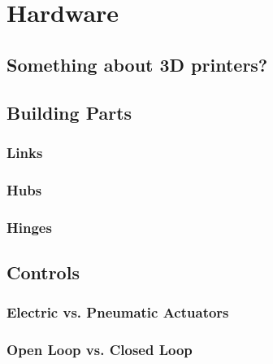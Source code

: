 \chapter{Hardware}\label{ch:hardware}
\section{Something about 3D printers?}
\section{Building Parts}
\subsection{Links}
\subsection{Hubs}
\subsection{Hinges}
\section{Controls}
\subsection{Electric vs. Pneumatic Actuators}
\subsection{Open Loop vs. Closed Loop}

